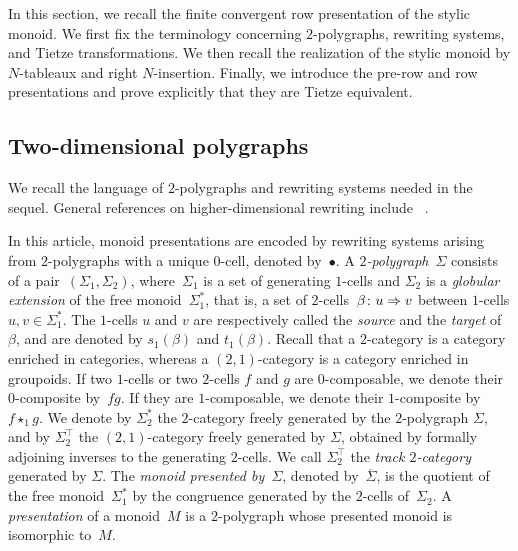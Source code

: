 \documentclass[a4paper, twoside, 11pt, english]{article}
\begin{document}
In this section, we recall the finite convergent row presentation of the
stylic monoid. We first fix the terminology concerning $2$-polygraphs,
rewriting systems, and Tietze transformations. We then recall the realization
of the stylic monoid by $N$-tableaux and right $N$-insertion. Finally, we
introduce the pre-row and row presentations and prove explicitly that they are
Tietze equivalent.


\subsection{Two-dimensional polygraphs}
\label{SS:TwoPolygraphs}
We recall the language of $2$-polygraphs and rewriting systems needed in the
sequel. General references on higher-dimensional rewriting include
~\cite{GuiraudMalbos18,GaussentGuiraudMalbos15,
GuiraudMalbos12advances,PolygraphsBook}.

In this article, monoid presentations are encoded by rewriting systems arising from $2$-polygraphs with a unique $0$-cell, denoted by~$\bullet$.
A \emph{$2$-polygraph}~$\Sigma$ consists of a pair~$
(\Sigma_1,\Sigma_2)$,
where~$\Sigma_1$ is a set of generating $1$-cells and $\Sigma_2$ is a \emph{globular extension} of the free monoid~$\Sigma_1^\ast$, that is, a set of $2$-cells~$\beta\colon u \Rightarrow v$
between $1$-cells $u,v\in \Sigma_1^\ast$.
The $1$-cells $u$ and $v$ are respectively called the \emph{source} and the \emph{target} of~$\beta$, and are denoted by $s_1(\beta)$ and $t_1(\beta)$.
Recall that a $2$-category is a category enriched in categories, whereas a $(2,1)$-category is a category enriched in groupoids.
If two $1$-cells or two $2$-cells $f$ and $g$ are $0$-composable, we denote their $0$-composite by~$fg$.
If they are $1$-composable, we denote their $1$-composite by~$f\star_1 g$.
We denote by $\Sigma_2^\ast$ the $2$-category freely generated by the
$2$-polygraph $\Sigma$, and by $\Sigma_2^\top$ the $(2,1)$-category freely
generated by $\Sigma$, obtained by formally adjoining inverses to the
generating $2$-cells. We call $\Sigma_2^\top$ the \emph{track $2$-category}
generated by $\Sigma$.
The \emph{monoid presented by~$\Sigma$}, denoted by~$\overline{\Sigma}$, is the quotient of the free monoid~$\Sigma_1^\ast$ by the congruence generated by the $2$-cells of~$\Sigma_2$.
A \emph{presentation} of a monoid~$M$ is a $2$-polygraph whose presented monoid is isomorphic to~$M$.
\end{document}
